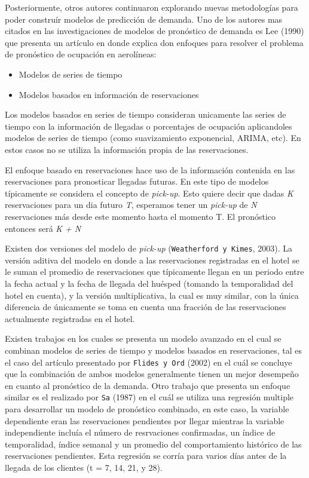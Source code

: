 {Posteriormente, otros autores continuaron explorando nuevas metodologías para poder construír modelos de predicción de demanda. Uno de los autores mas citados en las investigaciones de modelos de pronóstico de demanda es Lee (1990) que presenta un artículo en donde explica don enfoques para resolver el problema de pronóstico de ocupación en aerolíneas:
\begin{itemize}
  \item Modelos de series de tiempo 
  \item Modelos basados en información de reservaciones
\end{itemize}

Los modelos basados en series de tiempo consideran unicamente las series de tiempo con la información de llegadas o porcentajes de ocupación aplicandoles modelos de series de tiempo (como suavizamiento exponencial, ARIMA, etc). En estos casos no se utiliza la información propia de las reservaciones.

El enfoque basado en reservaciones hace uso de la información contenida en las reservaciones para pronosticar llegadas futuras. En este tipo de modelos típicamente se considera el concepto de \emph{pick-up}. Esto quiere decir que dadas \emph{K} reservaciones para un dia futuro \emph{T}, esperamos tener un \emph{pick-up} de \emph{N} reservaciones más desde este momento hasta el momento T. El pronóstico entonces será \emph{K + N}

Existen dos versiones del modelo de \emph{pick-up} (\texttt{Weatherford y Kimes}, 2003). La versión aditiva del modelo en donde a las reservaciones registradas en el hotel se le suman el promedio de reservaciones que típicamente llegan en un periodo entre la fecha actual y la fecha de llegada del huésped (tomando la temporalidad del hotel en cuenta), y la versión multiplicativa, la cual es muy similar, con la única diferencia de únicamente se toma en cuenta una fracción de las reservaciones actualmente registradas en el hotel.

Existen trabajos en los cuales se presenta un modelo avanzado en el cual se combinan modelos de series de tiempo y modelos basados en reservaciones, tal es el caso del artículo presentado por \texttt{Flides y Ord} (2002) en el cuál se concluye que la combinación de ambos modelos generalmente tienen un mejor desempeño en cuanto al pronóstico de la demanda. Otro trabajo que presenta un enfoque similar es el realizado por \texttt{Sa} (1987) en el cuál se utiliza una regresión multiple para desarrollar un modelo de pronóstico combinado, en este caso, la variable dependiente eran las reservaciones pendientes por llegar mientras la variable independiente incluía el número de resrvaciones confirmadas, un índice de temporalidad,  índice semanal y un promedio del comportamiento histórico de las reservaciones pendientes. Esta regresión se corría para varios días antes de la llegada de los clientes (t = 7, 14, 21, y 28).

}

